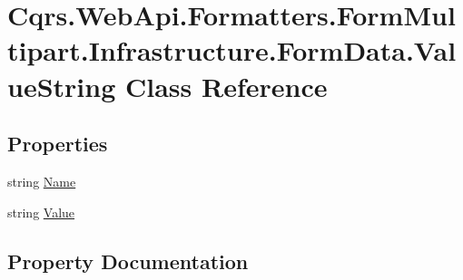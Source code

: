 \hypertarget{classCqrs_1_1WebApi_1_1Formatters_1_1FormMultipart_1_1Infrastructure_1_1FormData_1_1ValueString}{}\section{Cqrs.\+Web\+Api.\+Formatters.\+Form\+Multipart.\+Infrastructure.\+Form\+Data.\+Value\+String Class Reference}
\label{classCqrs_1_1WebApi_1_1Formatters_1_1FormMultipart_1_1Infrastructure_1_1FormData_1_1ValueString}
\subsection*{Properties}
\begin{DoxyCompactItemize}
\item 
string \hyperlink{classCqrs_1_1WebApi_1_1Formatters_1_1FormMultipart_1_1Infrastructure_1_1FormData_1_1ValueString_a75a080b90171a612155590a997076016_a75a080b90171a612155590a997076016}{Name}
\item 
string \hyperlink{classCqrs_1_1WebApi_1_1Formatters_1_1FormMultipart_1_1Infrastructure_1_1FormData_1_1ValueString_a2e4eb245c5d5148672d233903f2dfcd1_a2e4eb245c5d5148672d233903f2dfcd1}{Value}
\end{DoxyCompactItemize}


\subsection{Property Documentation}
\mbox{\label{classCqrs_1_1WebApi_1_1Formatters_1_1FormMultipart_1_1Infrastructure_1_1FormData_1_1ValueString_a75a080b90171a612155590a997076016_a75a080b90171a612155590a997076016}} 
